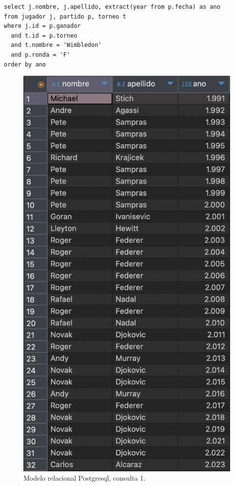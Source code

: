 \documentclass[11pt]{opticajnl}
\begin{document}
\begin{verbatim}
select j.nombre, j.apellido, extract(year from p.fecha) as ano
from jugador j, partido p, torneo t
where j.id = p.ganador 
  and t.id = p.torneo 
  and t.nombre = 'Wimbledon' 
  and p.ronda = 'F'
order by ano
\end{verbatim}

\begin{figure}[H]
\centering
\includegraphics[height=0.4\textheight]{fotos/q1_rel.png}
\caption{Modelo relacional Postgresql, consulta 1.}
\label{fig:q1_rel}
\end{figure}
\end{document}
